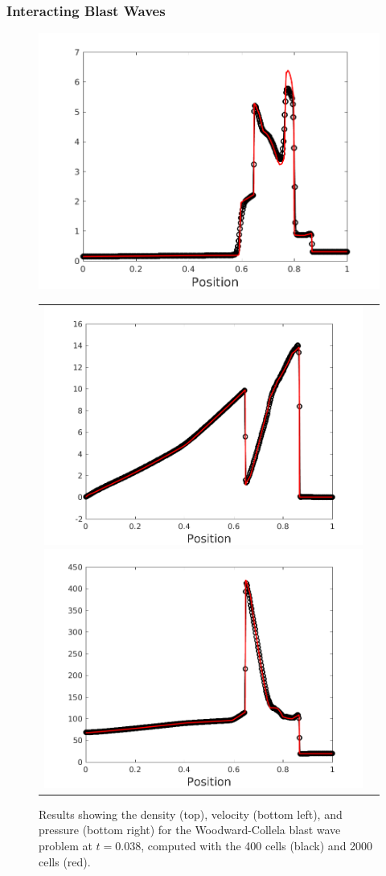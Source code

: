 \documentclass[10pt,preprint]{aastex}
\begin{document}
\subsubsection{Interacting Blast Waves}

\begin{figure}[h]
  \begin{center}
     \includegraphics[width=.95\textwidth]{BlastD.png}	
	\begin{tabular}{cc}
     \includegraphics[width=.475\textwidth]{BlastV.png}
     \includegraphics[width=.475\textwidth]{BlastP.png}	
    \end{tabular}
  \end{center}
  \caption{Results showing the density (top), velocity (bottom left), and pressure (bottom right) for the Woodward-Collela blast wave problem at $t=0.038$, computed with the 400 cells (black) and 2000 cells (red).}
  \label{fig:Blast}
\end{figure}
\clearpage
\end{document}
